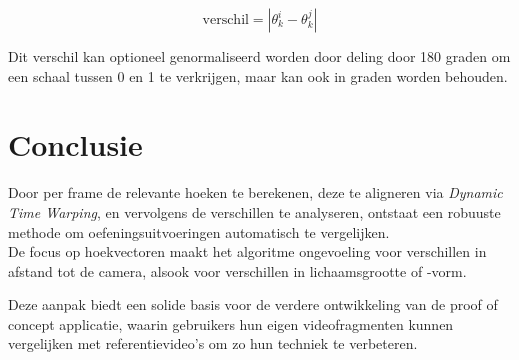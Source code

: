 \[
\text{verschil} = \left| \theta_k^i - \theta_k^j \right|
\]

Dit verschil kan optioneel genormaliseerd worden door deling door 180 graden om een schaal tussen 0 en 1 te verkrijgen, maar kan ook in graden worden behouden. 


\section{Conclusie}
Door per frame de relevante hoeken te berekenen, deze te aligneren via \textit{Dynamic Time Warping}, en vervolgens de verschillen te analyseren, ontstaat een robuuste methode om oefeningsuitvoeringen automatisch te vergelijken. \\
De focus op hoekvectoren maakt het algoritme ongevoeling voor verschillen in afstand tot de camera, alsook voor verschillen in lichaamsgrootte of -vorm.

\medskip
Deze aanpak biedt een solide basis voor de verdere ontwikkeling van de proof of concept applicatie, waarin gebruikers hun eigen videofragmenten kunnen vergelijken met referentievideo's om zo hun techniek te verbeteren.

